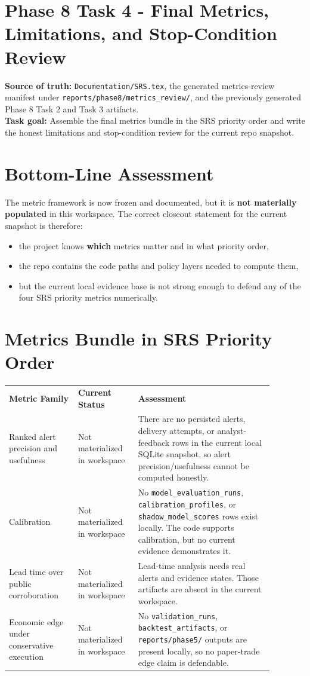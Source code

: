 \documentclass{article}
\begin{document}
\section*{Phase 8 Task 4 - Final Metrics, Limitations, and Stop-Condition Review}

\textbf{Source of truth:} \texttt{Documentation/SRS.tex}, the generated metrics-review manifest under \texttt{reports/phase8/metrics\_review/}, and the previously generated Phase 8 Task 2 and Task 3 artifacts.\\
\textbf{Task goal:} Assemble the final metrics bundle in the SRS priority order and write the honest limitations and stop-condition review for the current repo snapshot.

\section*{Bottom-Line Assessment}
The metric framework is now frozen and documented, but it is \textbf{not materially populated} in this workspace. The correct closeout statement for the current snapshot is therefore:
\begin{itemize}
\item the project knows \textbf{which} metrics matter and in what priority order,
\item the repo contains the code paths and policy layers needed to compute them,
\item but the current local evidence base is not strong enough to defend any of the four SRS priority metrics numerically.
\end{itemize}

\section*{Metrics Bundle in SRS Priority Order}
\begin{longtable}{p{0.23\linewidth}p{0.20\linewidth}p{0.45\linewidth}}
\textbf{Metric Family} & \textbf{Current Status} & \textbf{Assessment} \\
Ranked alert precision and usefulness & Not materialized in workspace & There are no persisted alerts, delivery attempts, or analyst-feedback rows in the current local SQLite snapshot, so alert precision/usefulness cannot be computed honestly. \\
Calibration & Not materialized in workspace & No \texttt{model\_evaluation\_runs}, \texttt{calibration\_profiles}, or \texttt{shadow\_model\_scores} rows exist locally. The code supports calibration, but no current evidence demonstrates it. \\
Lead time over public corroboration & Not materialized in workspace & Lead-time analysis needs real alerts and evidence states. Those artifacts are absent in the current workspace. \\
Economic edge under conservative execution & Not materialized in workspace & No \texttt{validation\_runs}, \texttt{backtest\_artifacts}, or \texttt{reports/phase5/} outputs are present locally, so no paper-trade edge claim is defendable. \\
\end{longtable}
\end{document}
